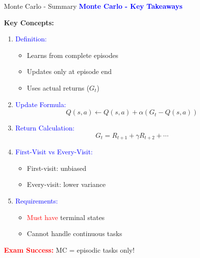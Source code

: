 \documentclass[8pt]{beamer}
\begin{document}
	\begin{frame}{Monte Carlo - Summary}
		\fontsize{6.5}{7.5}\selectfont
		\textcolor{blue}{\textbf{Monte Carlo - Key Takeaways}}
		
		\textbf{Key Concepts:}
		\begin{enumerate}
			\item \textcolor{blue}{Definition:}
			\begin{itemize}
				\item Learns from complete episodes
				\item Updates only at episode end
				\item Uses actual returns ($G_t$)
			\end{itemize}
			
			\item \textcolor{blue}{Update Formula:}
			\[
			Q(s,a) \leftarrow Q(s,a) + \alpha(G_t - Q(s,a))
			\]
			
			\item \textcolor{blue}{Return Calculation:}
			\[
			G_t = R_{t+1} + \gamma R_{t+2} + \cdots
			\]
			
			\item \textcolor{blue}{First-Visit vs Every-Visit:}
			\begin{itemize}
				\item First-visit: unbiased
				\item Every-visit: lower variance
			\end{itemize}
			
			\item \textcolor{blue}{Requirements:}
			\begin{itemize}
				\item \textcolor{red}{Must have} terminal states
				\item Cannot handle continuous tasks
			\end{itemize}
		\end{enumerate}
		
		\textcolor{red}{\textbf{Exam Success:}} MC = episodic tasks only!
	\end{frame}
	
	
\end{document}
